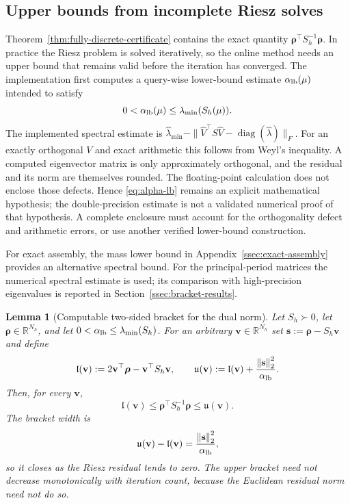 \documentclass[11pt]{amsart}
\newtheorem{lemma}[theorem]{Lemma}
\theoremstyle{remark}
\newcommand{\R}{\mathbb{R}}
\newcommand{\Sh}{S_h}
\newcommand{\norm}[1]{\left\lVert #1\right\rVert}
\newcommand{\rr}{\bm\rho}
\newcommand{\vv}{\mathbf v}
\newcommand{\sres}{\mathbf s}
\begin{document}
\subsection{Upper bounds from incomplete Riesz solves}
\label{ssec:guaranteed}
Theorem~\ref{thm:fully-discrete-certificate} contains the exact quantity
$\rr^\top\Sh^{-1}\rr$.  In practice the Riesz problem is solved iteratively,
so the online method needs an upper bound that remains valid before the
iteration has converged.  The implementation first computes a
query-wise lower-bound estimate $\alpha_{\rm lb}(\mu)$ intended to satisfy
\begin{equation}
  0<\alpha_{\rm lb}(\mu)\le \lambda_{\min}(\Sh(\mu)).
  \label{eq:alpha-lb}
\end{equation}
The implemented spectral estimate is
$\widehat\lambda_{\min}-\|\widehat V^\top S\widehat V-
\operatorname{diag}(\widehat\lambda)\|_F$.
For an exactly orthogonal $V$ and exact arithmetic this follows from Weyl's
inequality. A computed eigenvector matrix is only approximately orthogonal,
and the residual and its norm are themselves rounded. The floating-point calculation
does not enclose those defects. Hence \eqref{eq:alpha-lb} remains an
explicit mathematical hypothesis; the double-precision estimate is not a
validated numerical proof of that hypothesis. A complete enclosure must
account for the orthogonality defect and arithmetic errors, or use another
verified lower-bound construction.


For exact assembly, the mass lower bound in
Appendix~\ref{ssec:exact-assembly} provides an alternative spectral bound.
For the principal-period matrices the numerical spectral estimate is used;
its comparison with high-precision eigenvalues is reported in
Section~\ref{ssec:bracket-results}.
\begin{lemma}[Computable two-sided bracket for the dual norm]
\label{lem:guaranteed}
Let $\Sh\succ0$, let $\rr\in\R^{N_h}$, and let
$0<\alpha_{\rm lb}\le\lambda_{\min}(\Sh)$.  For an arbitrary
$\vv\in\R^{N_h}$ set $\sres:=\rr-\Sh\vv$ and define
\begin{equation}
  \mathfrak l(\vv):=2\vv^\top\rr-\vv^\top\Sh\vv,
  \qquad
  \mathfrak u(\vv):=\mathfrak l(\vv)
    +\frac{\norm{\sres}_2^2}{\alpha_{\rm lb}}.
  \label{eq:riesz-bracket-def}
\end{equation}
Then, for every $\vv$,
\begin{equation}
 \boxed{
   \mathfrak l(\vv)
   \le \rr^\top\Sh^{-1}\rr
   \le \mathfrak u(\vv).}
 \label{eq:riesz-bracket}
\end{equation}
The bracket width is
\begin{equation}
  \mathfrak u(\vv)-\mathfrak l(\vv)
  =\frac{\norm{\sres}_2^2}{\alpha_{\rm lb}},
  \label{eq:bracket-width}
\end{equation}
so it closes as the Riesz residual tends to zero. The upper bracket need
not decrease monotonically with iteration count, because the Euclidean
residual norm need not do so.
\end{lemma}
\end{document}
